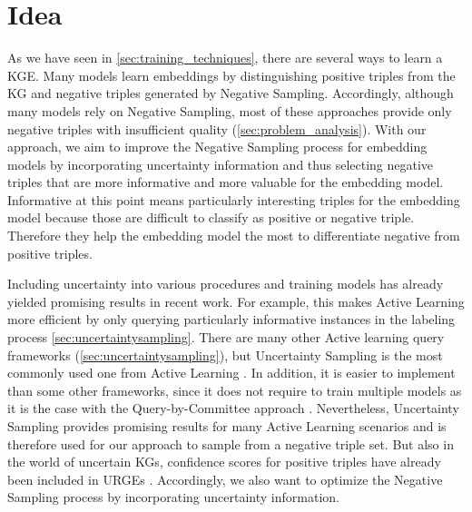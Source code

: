 \section{Idea} 
\label{sec:idea}


As we have seen in \autoref{sec:training_techniques}, there are several ways to learn a \ac{KGE}.
Many models learn embeddings by distinguishing positive triples from the \ac{KG} and negative triples generated by Negative Sampling.
Accordingly, although many models rely on Negative Sampling, most of these approaches provide only negative triples with insufficient quality (\autoref{sec:problem_analysis}).
With our approach, we aim to improve the Negative Sampling process for embedding models by incorporating uncertainty information and thus selecting negative triples that are more informative and more valuable for the embedding model.
Informative at this point means particularly interesting triples for the embedding model because those are difficult to classify as positive or negative triple.
Therefore they help the embedding model the most to differentiate negative from positive triples.

Including uncertainty into various procedures and training models has already yielded promising results in recent work.
For example, this makes Active Learning more efficient by only querying particularly informative instances in the labeling process \autoref{sec:uncertaintysampling}.
There are many other Active learning query frameworks (\autoref{sec:uncertaintysampling}), but Uncertainty Sampling is the most commonly used one from Active Learning \cite{Settles2009ActiveLL}.
In addition, it is easier to implement than some other frameworks, since it does not require to train multiple models as it is the case with the Query-by-Committee approach \cite{Settles2009ActiveLL}.
Nevertheless, Uncertainty Sampling provides promising results for many Active Learning scenarios and is therefore used for our approach to sample from a negative triple set.
But also in the world of uncertain \acp{KG}, confidence scores for positive triples have already been included in \acp{URGE} \cite{UKGE}.
Accordingly, we also want to optimize the Negative Sampling process by incorporating uncertainty information.

